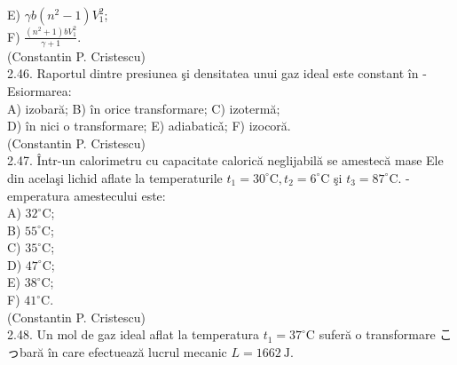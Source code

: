 \documentclass[10pt]{article}
\begin{document}
E) $\gamma b\left(n^{2}-1\right) V_{1}^{2}$;\\
F) $\frac{\left(n^{2}+1\right) b V_{1}^{2}}{\gamma+1}$.\\
(Constantin P. Cristescu)\\
2.46. Raportul dintre presiunea şi densitatea unui gaz ideal este constant în -Esiormarea:\\
A) izobară; B) în orice transformare; C) izotermă;\\
D) în nici o transformare; E) adiabaticǎ; F) izocoră.\\
(Constantin P. Cristescu)\\
2.47. Într-un calorimetru cu capacitate calorică neglijabilă se amestecă mase Ele din acelaşi lichid aflate la temperaturile $t_{1}=30^{\circ} \mathrm{C}, t_{2}=6^{\circ} \mathrm{C}$ şi $t_{3}=87^{\circ} \mathrm{C}$. - emperatura amestecului este:\\
A) $32^{\circ} \mathrm{C}$;\\
B) $55^{\circ} \mathrm{C}$;\\
C) $35^{\circ} \mathrm{C}$;\\
D) $47^{\circ} \mathrm{C}$;\\
E) $38^{\circ} \mathrm{C}$;\\
F) $41^{\circ} \mathrm{C}$.\\
(Constantin P. Cristescu)\\
2.48. Un mol de gaz ideal aflat la temperatura $t_{1}=37^{\circ} \mathrm{C}$ suferă o transformare こっbară în care efectuează lucrul mecanic $L=1662 \mathrm{~J}$.
\end{document}
